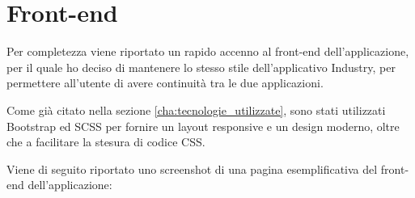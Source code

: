 \chapter{Front-end}
\label{cha:front-end}
Per completezza viene riportato un rapido accenno al front-end dell'applicazione, per il quale ho deciso di mantenere lo stesso stile dell'applicativo Industry, per permettere all'utente di avere continuità tra le due applicazioni. 

Come già citato nella sezione \ref{cha:tecnologie_utilizzate}, sono stati utilizzati Bootstrap ed SCSS per fornire un layout responsive e un design moderno, oltre che a facilitare la stesura di codice CSS. 

Viene di seguito riportato uno screenshot di una pagina esemplificativa del front-end dell'applicazione:



\clearpage
